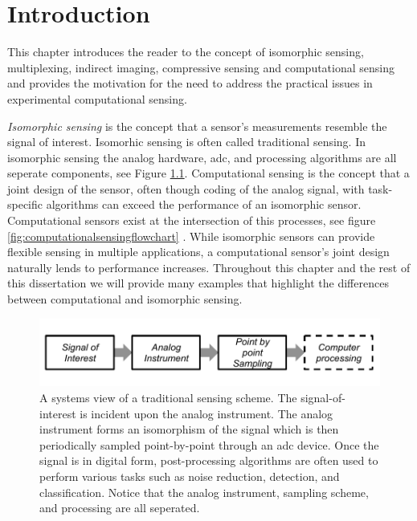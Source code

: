 \chapter{Introduction}

This chapter introduces the reader to the concept of isomorphic sensing, multiplexing, indirect imaging, compressive sensing and computational sensing and provides the motivation for the need to address the practical issues in experimental computational sensing. 

\emph{Isomorphic sensing} is the concept that a sensor's measurements resemble the signal of interest. Isomorhic sensing is often called traditional sensing. In isomorphic sensing the analog hardware, \acrfull{adc}, and processing algorithms are all seperate components, see Figure \ref{fig:isomorphicsesingflowchart}. Computational sensing is the concept that a joint design of the sensor, often though coding of the analog signal, with task-specific algorithms can exceed the performance of an isomorphic sensor. Computational sensors exist at the intersection of this processes, see figure \ref{fig:computationalsensingflowchart} \cite{neifeld2006taskSpecificSensing}. While isomorphic sensors can provide flexible sensing in multiple applications, a computational sensor's joint design naturally lends to performance increases. Throughout this chapter and the rest of this dissertation we will provide many examples that highlight the differences between computational and isomorphic sensing. 

\begin{figure}
    \centering
    \includegraphics[scale=1]{isomorphicsensorflowchart}
    \caption{A systems view of a traditional sensing scheme. The signal-of-interest is incident upon the analog instrument. The analog instrument forms an isomorphism of the signal which is then periodically sampled point-by-point through an \gls{adc} device. Once the signal is in digital form, post-processing algorithms are often used to perform various tasks such as noise reduction, detection, and classification. Notice that the analog instrument, sampling scheme, and processing are all seperated. }
    \label{fig:isomorphicsesingflowchart}
\end{figure}


